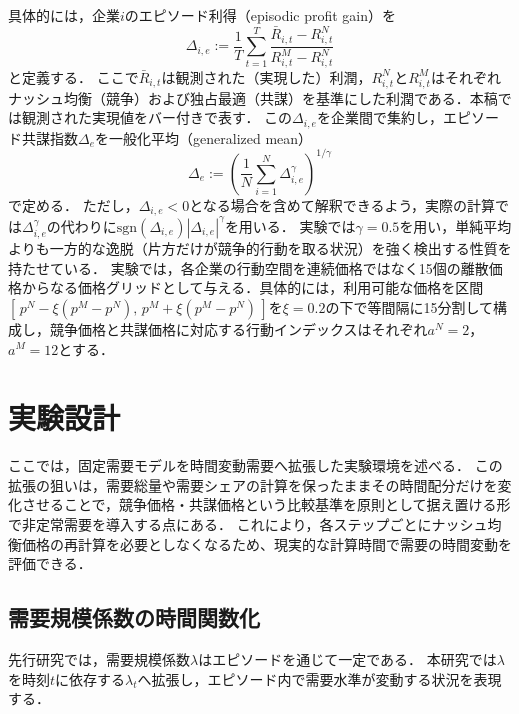 \documentclass[runningheads]{llncs}
\begin{document}
具体的には，企業$i$のエピソード利得（episodic profit gain）を
\begin{equation}
\Delta_{i,e}
:=
\frac{1}{T}\sum_{t=1}^{T}
\frac{\bar{R}_{i,t}-R^N_{i,t}}{R^M_{i,t}-R^N_{i,t}}
\label{eq:episodic_profit_gain}
\end{equation}
と定義する．
ここで$\bar{R}_{i,t}$は観測された（実現した）利潤，$R^N_{i,t}$と$R^M_{i,t}$はそれぞれナッシュ均衡（競争）および独占最適（共謀）を基準にした利潤である．本稿では観測された実現値をバー付きで表す．
この$\Delta_{i,e}$を企業間で集約し，エピソード共謀指数$\Delta_e$を一般化平均（generalized mean）
\begin{equation}
\Delta_{e}
:=
\left(\frac{1}{N}\sum_{i=1}^{N}\Delta_{i,e}^{\gamma}\right)^{1/\gamma}
\label{eq:collusion_index}
\end{equation}
で定める．
ただし，$\Delta_{i,e}<0$となる場合を含めて解釈できるよう，実際の計算では$\Delta_{i,e}^{\gamma}$の代わりに$\mathrm{sgn}(\Delta_{i,e})|\Delta_{i,e}|^{\gamma}$を用いる．
実験では$\gamma=0.5$を用い，単純平均よりも一方的な逸脱（片方だけが競争的行動を取る状況）を強く検出する性質を持たせている．
実験では，各企業の行動空間を連続価格ではなく15個の離散価格からなる価格グリッドとして与える．具体的には，利用可能な価格を区間$[\,p^N-\xi(p^M-p^N),\,p^M+\xi(p^M-p^N)\,]$を$\xi=0.2$の下で等間隔に15分割して構成し，競争価格と共謀価格に対応する行動インデックスはそれぞれ$a^N=2$，$a^M=12$とする．


\section{実験設計}
\label{sec:method_timevarying_lambda}

ここでは，固定需要モデルを時間変動需要へ拡張した実験環境を述べる．
この拡張の狙いは，需要総量や需要シェアの計算を保ったままその時間配分だけを変化させることで，競争価格・共謀価格という比較基準を原則として据え置ける形で非定常需要を導入する点にある．
これにより，各ステップごとにナッシュ均衡価格の再計算を必要としなくなるため、現実的な計算時間で需要の時間変動を評価できる．

\subsection{需要規模係数の時間関数化}
先行研究\cite{friedrich2025learning}では，需要規模係数$\lambda$はエピソードを通じて一定である．
本研究では$\lambda$を時刻$t$に依存する$\lambda_t$へ拡張し，エピソード内で需要水準が変動する状況を表現する．
\end{document}
